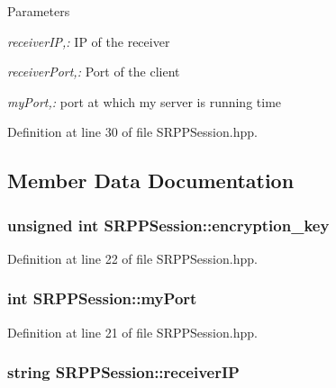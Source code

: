 \begin{DoxyParams}{Parameters}
\item[{\em receiverIP,:}]IP of the receiver \item[{\em receiverPort,:}]Port of the client \item[{\em myPort,:}]port at which my server is running  time \end{DoxyParams}


Definition at line 30 of file SRPPSession.hpp.



\subsection{Member Data Documentation}
\hypertarget{class_s_r_p_p_session_aa1308daad577ca6664ce070e7e79272b}{
\subsubsection[{encryption\_\-key}]{\setlength{\rightskip}{0pt plus 5cm}unsigned int {\bf SRPPSession::encryption\_\-key}}}
\label{class_s_r_p_p_session_aa1308daad577ca6664ce070e7e79272b}


Definition at line 22 of file SRPPSession.hpp.

\hypertarget{class_s_r_p_p_session_a8c5abdbb98a0bf50b674407b88fa7756}{
\subsubsection[{myPort}]{\setlength{\rightskip}{0pt plus 5cm}int {\bf SRPPSession::myPort}}}
\label{class_s_r_p_p_session_a8c5abdbb98a0bf50b674407b88fa7756}


Definition at line 21 of file SRPPSession.hpp.

\hypertarget{class_s_r_p_p_session_a559c805c8fa73759708828a3dc96b9f7}{
\subsubsection[{receiverIP}]{\setlength{\rightskip}{0pt plus 5cm}string {\bf SRPPSession::receiverIP}}}
\label{class_s_r_p_p_session_a559c805c8fa73759708828a3dc96b9f7}


